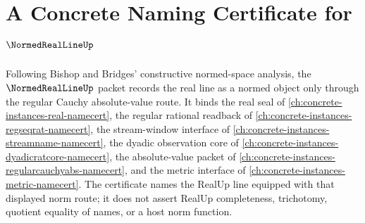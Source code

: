 \chapter{A Concrete Naming Certificate for $\NormedRealLineUp$}
\label{ch:concrete-instances-normed-real-line-namecert}

Following Bishop and Bridges' constructive normed-space analysis, the $\NormedRealLineUp$ packet records the real line as a normed object only through the regular Cauchy absolute-value route. It binds the real seal of \autoref{ch:concrete-instances-real-namecert}, the regular rational readback of \autoref{ch:concrete-instances-regseqrat-namecert}, the stream-window interface of \autoref{ch:concrete-instances-streamname-namecert}, the dyadic observation core of \autoref{ch:concrete-instances-dyadicratcore-namecert}, the absolute-value packet of \autoref{ch:concrete-instances-regularcauchyabs-namecert}, and the metric interface of \autoref{ch:concrete-instances-metric-namecert}. The certificate names the RealUp line equipped with that displayed norm route; it does not assert RealUp completeness, trichotomy, quotient equality of names, or a host norm function.


